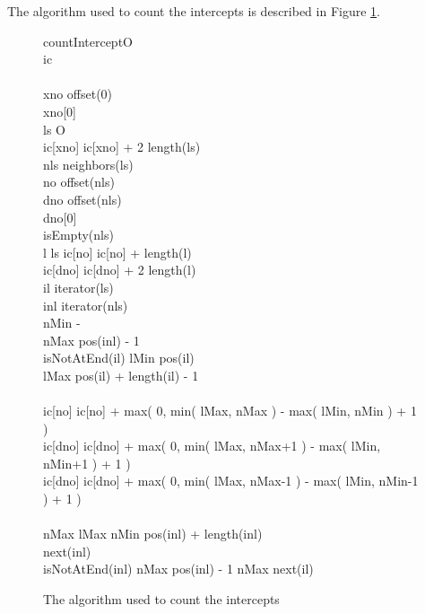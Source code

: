 \documentclass{InsightArticle}
\begin{document}
The algorithm used to count the intercepts is described in Figure \ref{interceptCountAlgo}.

\begin{figure}[htbp]
\centering
\small
\begin{pseudocode}[framebox]{countIntercept}{O}
 \\
ic \GETS \emptyset \\
 \\
xno \GETS offset(0) \\
xno[0]  \\
\FOREACH ls \in O \DO
\BEGIN
   \\
  ic[xno] \GETS ic[xno] + 2 \cdot length(ls) \\
  \FOREACH nls \in neighbors(ls) \DO
  \BEGIN
     \\
    no \GETS offset(nls) \\
    dno \GETS offset(nls) \\
    dno[0]  \\
    \IF isEmpty(nls) \THEN
    \BEGIN
       \\
      \FOREACH l \in ls \DO
      \BEGIN
    ic[no] \GETS ic[no] + length(l)\\
    ic[dno] \GETS ic[dno] + 2 \cdot length(l)
      \END
    \END
    \ELSE
    \BEGIN
       \\
      il \GETS iterator(ls) \\
      inl \GETS iterator(nls) \\
      nMin \GETS -\infty \\
      nMax \GETS pos(inl) - 1 \\
      \WHILE isNotAtEnd(il) \DO
      \BEGIN
        lMin \GETS pos(il) \\
        lMax \GETS pos(il) + length(il) - 1 \\
         \\
    ic[no] \GETS ic[no] + max( 0, min( lMax, nMax ) - max( lMin, nMin ) + 1 ) \\
    ic[dno] \GETS ic[dno] + max( 0, min( lMax, nMax+1 ) - max( lMin, nMin+1 ) + 1 )\\
    ic[dno] \GETS ic[dno] + max( 0, min( lMax, nMax-1 ) - max( lMin, nMin-1 ) + 1 )\\
         \\
    \IF nMax \leq lMax \THEN
    \BEGIN
          nMin \GETS pos(inl) + length(inl) \\
          next(inl) \\
          \IF isNotAtEnd(inl) \DO
            nMax \GETS pos(inl) - 1
          \ELSE
            nMax \GETS \infty
    \END
    \ELSE
          next(il)
      \END
    \END
  \END
\END
\end{pseudocode}
\caption{\label{interceptCountAlgo}The algorithm used to count the intercepts}
\end{figure}
\end{document}
